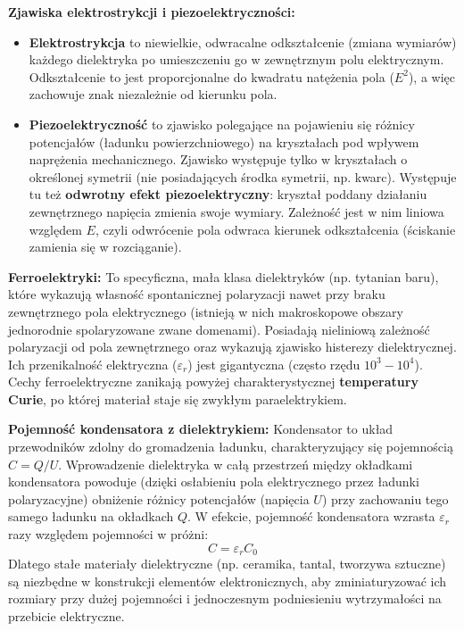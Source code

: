 \documentclass[11pt, a4paper]{article}
\begin{document}
\textbf{Zjawiska elektrostrykcji i piezoelektryczności:}
\begin{itemize}
    \item \textbf{Elektrostrykcja} to niewielkie, odwracalne odkształcenie (zmiana wymiarów) każdego dielektryka po umieszczeniu go w zewnętrznym polu elektrycznym. Odkształcenie to jest proporcjonalne do kwadratu natężenia pola ($E^2$), a więc zachowuje znak niezależnie od kierunku pola.
    \item \textbf{Piezoelektryczność} to zjawisko polegające na pojawieniu się różnicy potencjałów (ładunku powierzchniowego) na kryształach pod wpływem naprężenia mechanicznego. Zjawisko występuje tylko w kryształach o określonej symetrii (nie posiadających środka symetrii, np. kwarc). Występuje tu też \textbf{odwrotny efekt piezoelektryczny}: kryształ poddany działaniu zewnętrznego napięcia zmienia swoje wymiary. Zależność jest w nim liniowa względem $E$, czyli odwrócenie pola odwraca kierunek odkształcenia (ściskanie zamienia się w rozciąganie).
\end{itemize}

\textbf{Ferroelektryki:}
To specyficzna, mała klasa dielektryków (np. tytanian baru), które wykazują własność spontanicznej polaryzacji nawet przy braku zewnętrznego pola elektrycznego (istnieją w nich makroskopowe obszary jednorodnie spolaryzowane zwane domenami). Posiadają nieliniową zależność polaryzacji od pola zewnętrznego oraz wykazują zjawisko histerezy dielektrycznej. Ich przenikalność elektryczna ($\varepsilon_r$) jest gigantyczna (często rzędu $10^3 - 10^4$). Cechy ferroelektryczne zanikają powyżej charakterystycznej \textbf{temperatury Curie}, po której materiał staje się zwykłym paraelektrykiem.

\textbf{Pojemność kondensatora z dielektrykiem:}
Kondensator to układ przewodników zdolny do gromadzenia ładunku, charakteryzujący się pojemnością $C = Q/U$. Wprowadzenie dielektryka w całą przestrzeń między okładkami kondensatora powoduje (dzięki osłabieniu pola elektrycznego przez ładunki polaryzacyjne) obniżenie różnicy potencjałów (napięcia $U$) przy zachowaniu tego samego ładunku na okładkach $Q$. W efekcie, pojemność kondensatora wzrasta $\varepsilon_r$ razy względem pojemności w próżni:
\[
C = \varepsilon_r C_0
\]
Dlatego stałe materiały dielektryczne (np. ceramika, tantal, tworzywa sztuczne) są niezbędne w konstrukcji elementów elektronicznych, aby zminiaturyzować ich rozmiary przy dużej pojemności i jednoczesnym podniesieniu wytrzymałości na przebicie elektryczne.
\end{document}
